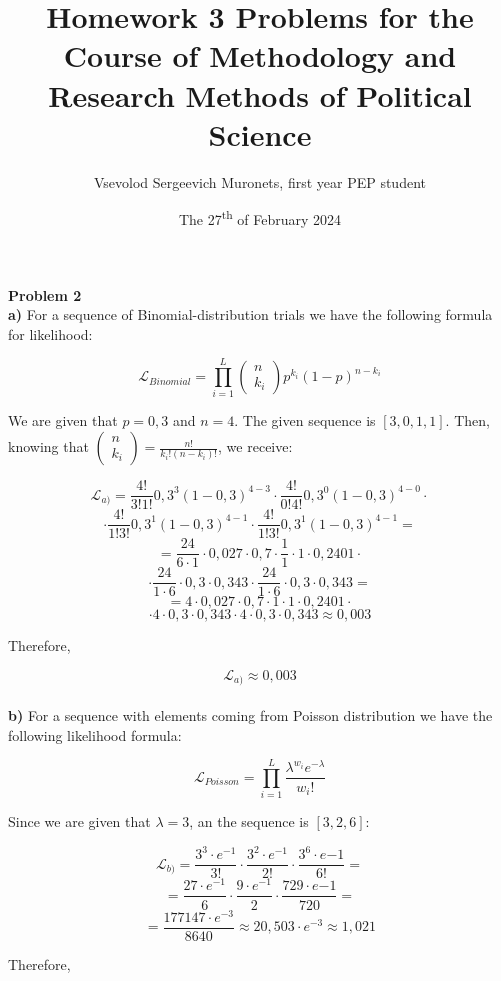 \documentclass{article}
\title{Homework 3 Problems for the Course of Methodology and Research Methods of Political Science}
\author{Vsevolod Sergeevich Muronets, first year PEP student}
\date{The 27\textsuperscript{th} of February 2024}
\begin{document}
\maketitle
\textbf{Problem 2}
\\

\textbf{a)} For a sequence of Binomial-distribution trials we have the following formula for likelihood:

$$\mathcal{L}_{Binomial} = \prod^{L}_{i=1} \left( \begin{array}{c} n \\ k_i \end{array} \right)p^{k_i}(1-p)^{n-k_i}$$

We are given that $p = 0,3$ and $n = 4$. The given sequence is $[3, 0, 1, 1]$. Then, knowing that $\left( \begin{array}{c} n \\ k_i \end{array} \right) = \frac{n!}{k_{i}!(n - k_{i})!}$, we receive:

$$\mathcal{L}_{a)} = \frac{4!}{3!1!}0,3^{3}(1 - 0,3)^{4-3} \cdot \frac{4!}{0!4!}0,3^{0}(1 - 0,3)^{4-0} \cdot$$
$$\cdot \frac{4!}{1!3!}0,3^{1}(1 - 0,3)^{4-1} \cdot \frac{4!}{1!3!}0,3^{1}(1 - 0,3)^{4-1}=$$
$$= \frac{24}{6 \cdot 1} \cdot 0,027 \cdot 0,7 \cdot \frac{1}{1} \cdot 1 \cdot 0,2401 \cdot$$
$$\cdot \frac{24}{1 \cdot 6} \cdot 0,3 \cdot 0,343 \cdot \frac{24}{1 \cdot 6} \cdot 0,3 \cdot 0,343 =$$
$$= 4 \cdot 0,027 \cdot 0,7 \cdot 1 \cdot 1 \cdot 0,2401 \cdot$$
$$\cdot 4 \cdot 0,3 \cdot 0,343 \cdot 4 \cdot 0,3 \cdot 0,343 \approx 0,003$$

Therefore,

$$\mathcal{L}_{a)} \approx 0,003$$
\\

\textbf{b)}  For a sequence with elements coming from Poisson distribution we have the following likelihood formula:

$$\mathcal{L}_{Poisson} = \prod^{L}_{i=1}  \frac{\lambda^{w_i}e^{-\lambda}}{w_{i}!}$$

Since we are given that $\lambda = 3$, an the sequence is $[3, 2, 6]$:

$$\mathcal{L}_{b)} = \frac{3^{3} \cdot e^{-1}}{3!} \cdot \frac{3^{2} \cdot e^{-1}}{2!} \cdot \frac{3^{6} \cdot e{-1}}{6!} =$$
$$= \frac{27 \cdot e^{-1}}{6} \cdot \frac{9 \cdot e^{-1}}{2} \cdot \frac{729 \cdot e{-1}}{720} =$$
$$= \frac{177147 \cdot e^{-3}}{8640} \approx 20,503 \cdot e^{-3} \approx 1,021$$

Therefore,
\end{document}
